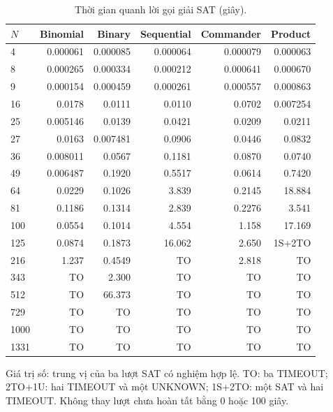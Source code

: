 \begin{table}[pos=H]
\centering
\small
\caption{Thời gian quanh lời gọi giải SAT (giây).}
\label{tab:sat_solve}
\setlength{\tabcolsep}{4pt}
\begin{tabular}{@{}lrrrrr@{}}
\toprule
$N$ & Binomial & Binary & Sequential & Commander & Product \\
\midrule
4 & 0.000061 & 0.000085 & 0.000064 & 0.000079 & 0.000063 \\
8 & 0.000265 & 0.000334 & 0.000212 & 0.000641 & 0.000670 \\
9 & 0.000154 & 0.000459 & 0.000261 & 0.000557 & 0.000863 \\
16 & 0.0178 & 0.0111 & 0.0110 & 0.0702 & 0.007254 \\
25 & 0.005146 & 0.0139 & 0.0421 & 0.0209 & 0.0211 \\
27 & 0.0163 & 0.007481 & 0.0906 & 0.0446 & 0.0832 \\
36 & 0.008011 & 0.0567 & 0.1181 & 0.0870 & 0.0740 \\
49 & 0.006487 & 0.1920 & 0.5517 & 0.0614 & 0.7420 \\
64 & 0.0229 & 0.1026 & 3.839 & 0.2145 & 18.884 \\
81 & 0.1186 & 0.1314 & 2.839 & 0.2276 & 3.541 \\
100 & 0.0554 & 0.1014 & 4.554 & 1.158 & 17.169 \\
125 & 0.0874 & 0.1873 & 16.062 & 2.650 & 1S+2TO \\
216 & 1.237 & 0.4549 & TO & 2.818 & TO \\
343 & TO & 2.300 & TO & TO & TO \\
512 & TO & 66.373 & TO & TO & TO \\
729 & TO & TO & TO & TO & TO \\
1000 & TO & TO & TO & TO & TO \\
1331 & TO & TO & TO & TO & TO \\
\bottomrule
\end{tabular}
\par\smallskip\begin{minipage}{\linewidth}\footnotesize Giá trị số: trung vị của ba lượt SAT có nghiệm hợp lệ. TO: ba TIMEOUT; 2TO+1U: hai TIMEOUT và một UNKNOWN; 1S+2TO: một SAT và hai TIMEOUT. Không thay lượt chưa hoàn tất bằng 0 hoặc 100 giây.\end{minipage}
\end{table}
